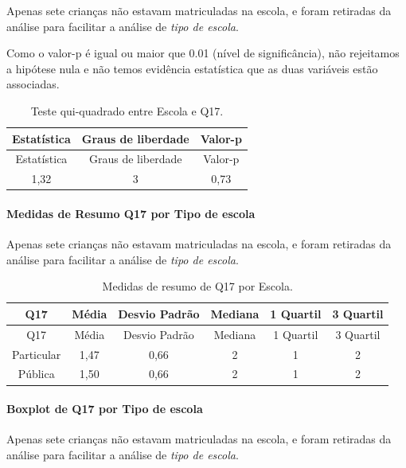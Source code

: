 \documentclass[]{article}
\let\oldparagraph\paragraph
\renewcommand{\paragraph}[1]{\oldparagraph{#1}\mbox{}}
\begin{document}
Apenas sete crianças não estavam matriculadas na escola, e foram retiradas da análise para facilitar a análise de \emph{tipo de escola}.

Como o valor-p é igual ou maior que 0.01 (nível de significância), não rejeitamos a hipótese nula e não temos evidência estatística que as duas variáveis estão associadas.

\begin{longtable}[]{@{}ccc@{}}
\caption{\label{tab:unnamed-chunk-232}Teste qui-quadrado entre Escola e Q17.}\tabularnewline
\toprule
Estatística & Graus de liberdade & Valor-p\tabularnewline
\midrule
\endfirsthead
\toprule
Estatística & Graus de liberdade & Valor-p\tabularnewline
\midrule
\endhead
1,32 & 3 & 0,73\tabularnewline
\bottomrule
\end{longtable}

\cleardoublepage

\hypertarget{medidas-de-resumo-q17-por-tipo-de-escola}{%
\paragraph{Medidas de Resumo Q17 por Tipo de escola}\label{medidas-de-resumo-q17-por-tipo-de-escola}}

Apenas sete crianças não estavam matriculadas na escola, e foram retiradas da análise para facilitar a análise de \emph{tipo de escola}.

\begin{longtable}[]{@{}cccccc@{}}
\caption{\label{tab:unnamed-chunk-233}Medidas de resumo de Q17 por Escola.}\tabularnewline
\toprule
Q17 & Média & Desvio Padrão & Mediana & 1 Quartil & 3 Quartil\tabularnewline
\midrule
\endfirsthead
\toprule
Q17 & Média & Desvio Padrão & Mediana & 1 Quartil & 3 Quartil\tabularnewline
\midrule
\endhead
Particular & 1,47 & 0,66 & 2 & 1 & 2\tabularnewline
Pública & 1,50 & 0,66 & 2 & 1 & 2\tabularnewline
\bottomrule
\end{longtable}

\hypertarget{boxplot-de-q17-por-tipo-de-escola}{%
\paragraph{Boxplot de Q17 por Tipo de escola}\label{boxplot-de-q17-por-tipo-de-escola}}

Apenas sete crianças não estavam matriculadas na escola, e foram retiradas da análise para facilitar a análise de \emph{tipo de escola}.
\end{document}
